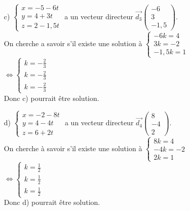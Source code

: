 \documentclass[a4paper, 12pt]{article}
\begin{document}
\begin{itemize}
    \item[c)] $\begin{cases} x = -5 - 6t \\ y = 4 + 3t \\ z = 2-1,5t \end{cases}$ a un vecteur directeur $\vec{d_3}\begin{pmatrix} -6 \\ 3 \\ -1,5 \end{pmatrix}$. 
        \\On cherche a savoir s'il existe une solution à $\begin{cases} -6k = 4 \\ 3k = -2 \\ -1,5k = 1 \end{cases}$
        \\
        $\iff \begin{cases} k = -\frac{2}{3} \\ k = -\frac{2}{3} \\k = -\frac{2}{3} \end{cases}$ 
        \\[2mm]
        Donc c) pourrait être solution. \vspace{5mm}

    \item[d)] $\begin{cases} x = -2 - 8t \\ y = 4 - 4t \\ z = 6 + 2t \end{cases}$ a un vecteur directeur $\vec{d_4}\begin{pmatrix} 8 \\ -4 \\ 2 \end{pmatrix}$. 
        \\On cherche à savoir s'il existe une solution à $\begin{cases} 8k = 4 \\-4k = -2 \\ 2k = 1 \end{cases}$
        \\
        $\iff \begin{cases} k = \frac{1}{2} \\ k = \frac{1}{2} \\k = \frac{1}{2} \end{cases}$
        \\[2mm]
        Donc d) pourrait être solution. \vspace{5mm}
\end{itemize}
\end{document}

